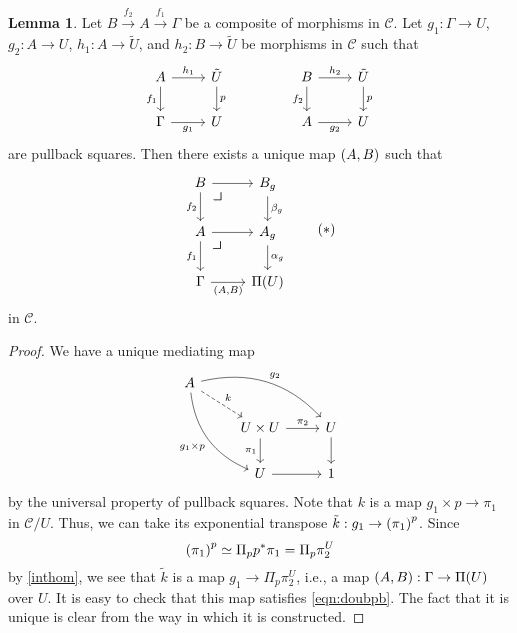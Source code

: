 \documentclass[10pt,letterpaper,cm]{nupset}
\theoremstyle{definition}
\theoremstyle{theorem}
\newtheorem{lemma}[definition]{Lemma}
\theoremstyle{remark}
\newcommand{\0}{\mathbf{0}}
\newcommand{\1}{\mathbf{1}}
\newcommand{\2}{\mathbf{2}}
\renewcommand{\c}{\mathscr{C}}
\begin{document}
\begin{lemma}\label{generic}
Let $B \overset{f_2}{\longrightarrow} A \overset{f_1}{\longrightarrow} \Gamma$ be a composite of morphisms in $\c$. Let $g_1: \Gamma \to U$, $g_2 : A\to U$, $h_1: A\to \tilde{U}$, and $h_2 : B \to \tilde{U}$ be morphisms in $\c$ such that 
\[
\begin{tikzcd}
A \arrow[r, "h_1"] \arrow[d, "f_1"'] & \tilde{U} \arrow[d, "p"] &  & B \arrow[r, "h_2"] \arrow[d, "f_2"'] & \tilde{U} \arrow[d, "p"] \\
\Gamma \arrow[r, "g_1"']             & U                        &  & A \arrow[r, "g_2"']                  & U                       
\end{tikzcd}
\] are pullback squares. Then there exists a unique map $\mleft(A, B\mright)$ such that 
\[
\label{eqn:doubpb} \begin{tikzcd}
B \arrow[d, "f_2"'] \arrow[r]   \arrow[dr, phantom, "\scalebox{1.5}{\color{black}$\lrcorner$}", very near start] & B_g \arrow[d, "\beta_g"]  \\
A \arrow[d, "f_1"'] \arrow[r]   \arrow[dr, phantom, "\scalebox{1.5}{\color{black}$\lrcorner$}", very near start] & A_g \arrow[d, "\alpha_g"] \\
\Gamma \arrow[r, "{\mleft(A, B\mright)}"']              & \Pi(U)                   
\end{tikzcd} \tag{$\ast$}
\] in $\c$.
\end{lemma}
\begin{proof}
We have a unique mediating map
\[
\begin{tikzcd}
A \arrow[rrd, "g_2", bend left] \arrow[rdd, "g_1\times p"', bend right] \arrow[rd, "k", dashed] &                                                  &             \\
                                                                                                & U\times U \arrow[r, "\pi_2"] \arrow[d, "\pi_1"'] & U \arrow[d] \\
                                                                                                & U \arrow[r]                                      & 1          
\end{tikzcd}
\] by the universal property of pullback squares. Note that $k$ is a map $g_1 \times p \to \pi_1$ in $\c/U$. Thus, we can take its exponential transpose $\tilde{k} : g_1 \to \mleft(\pi_1\mright)^p$. Since $$\mleft(\pi_1\mright)^p \simeq \Pi_pp^{\ast}{\pi_1}= \Pi_p{\pi_2^U}$$ by \cref{inthom}, we see that  $\tilde{k}$ is a map $g_1 \to  \Pi_p{\pi_2^U}$, i.e., a map $\mleft(A, B\mright) : \Gamma \to \Pi(U)$ over $U$. It is easy to check that this map satisfies \eqref{eqn:doubpb}. The fact that it is unique is clear from the way in which  it is constructed.
\end{proof}
\end{document}
